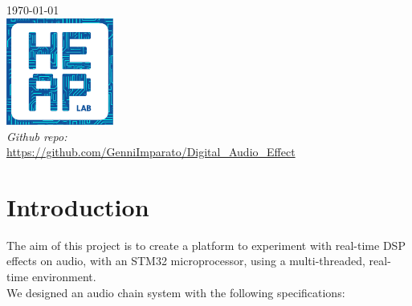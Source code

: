 \begin{titlepage}


{\large \today}\\[2cm] %


\includegraphics[width=100pt]{img/heaplogo.pdf}\\[1cm] %

\emph{Github repo:}\\
\href{https://github.com/GenniImparato/Digital\_Audio\_Effect}{https://github.com/GenniImparato/Digital\_Audio\_Effect}\par
 

\vfill %

\end{titlepage}

\tableofcontents
\newpage


\section{Introduction}
\label{sec:Intro}

The aim of this project is to create a platform to experiment with real-time DSP effects on audio, with an STM32 microprocessor, using a multi-threaded, real-time environment. \\
We designed an audio chain system with the following specifications:

